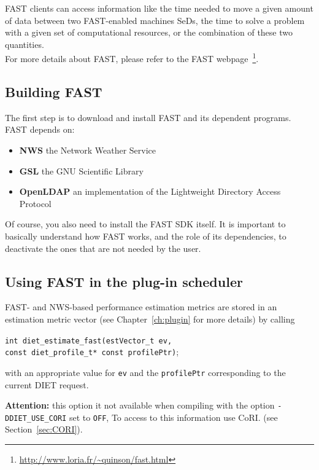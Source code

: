 FAST clients can access information like the time needed to move a
given amount of data between two FAST-enabled machines SeDs, the
time to solve a problem with a given set of computational resources,
or the combination of these two quantities.\\

For more details about FAST, please refer to the FAST
webpage~\footnote{\url{http://www.loria.fr/~quinson/fast.html}}.

\subsection{Building FAST}

The first step is to download and install FAST and its
dependent programs.  FAST depends on:
\begin{itemize}
 \item{\textbf{NWS}} the Network Weather Service
 \item{\textbf{GSL}} the GNU Scientific Library
 \item{\textbf{OpenLDAP}} an implementation of the Lightweight
                          Directory Access Protocol
\end{itemize}
Of course, you also need to install the FAST SDK itself. It is important to
 basically understand how FAST works, and the role of its dependencies, to
deactivate the ones that are not needed by the user.

\subsection{Using FAST in the plug-in scheduler}\label{subsection:callFAST}

FAST- and NWS-based performance estimation metrics are stored in
  an estimation metric vector (see Chapter~\ref{ch:plugin} for more details) by calling
  \begin{tabbing}
    \texttt{int diet\_estimate\_fast(}\=\texttt{estVector\_t ev,} \\
    \> \texttt{const diet\_profile\_t* const profilePtr)};
  \end{tabbing}
   with an appropriate value for \texttt{ev} and the
   \texttt{profilePtr} corresponding to the current DIET request.

   \textbf{Attention: } this option it not available when compiling 
   with the option \texttt{-DDIET\_USE\_CORI} set to \texttt{OFF}, 
   To access to this information use CoRI.
   (see Section~\ref{sec:CORI}).

